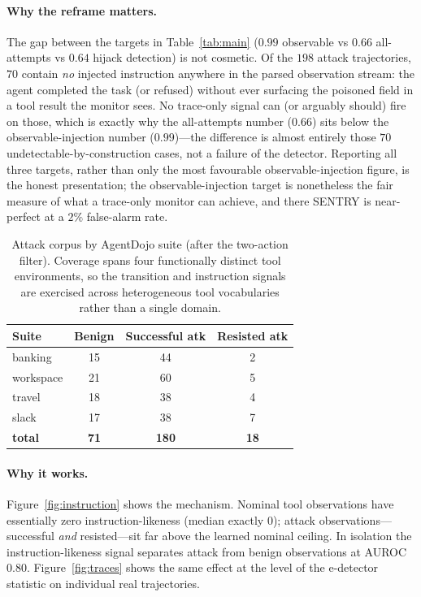 \documentclass[10pt,journal,compsoc]{IEEEtran}
\newcommand{\botrule}{\bottomrule}
\theoremstyle{plain}
\theoremstyle{definition}
\begin{document}
\paragraph{Why the reframe matters.}\label{sec:reframe} The gap between the
targets in Table~\ref{tab:main} (\(0.99\) observable vs \(0.66\) all-attempts
vs \(0.64\) hijack detection) is not cosmetic. Of the \(198\) attack
trajectories, \(70\) contain \emph{no} injected instruction anywhere in the
parsed observation stream: the agent completed the task (or refused) without
ever surfacing the poisoned field in a tool result the monitor sees. No
trace-only signal can (or arguably should) fire on those, which is exactly why
the all-attempts number (\(0.66\)) sits below the observable-injection number
(\(0.99\))---the difference is almost entirely those \(70\)
undetectable-by-construction cases, not a failure of the detector. Reporting
all three targets, rather than only the most favourable observable-injection
figure, is the honest presentation; the observable-injection target is
nonetheless the fair measure of what a trace-only monitor can achieve, and
there SENTRY is near-perfect at a \(2\%\) false-alarm rate.

\begin{table}[!t]
\centering
\caption{Attack corpus by AgentDojo suite (after the two-action filter).
Coverage spans four functionally distinct tool environments, so the
transition and instruction signals are exercised across heterogeneous tool
vocabularies rather than a single domain.}\label{tab:persuite}
\begin{tabular}{@{}lccc@{}}
\toprule
Suite & Benign & Successful atk & Resisted atk \\
\midrule
banking   & 15 & 44 & 2 \\
workspace & 21 & 60 & 5 \\
travel    & 18 & 38 & 4 \\
slack     & 17 & 38 & 7 \\
\midrule
\textbf{total} & \textbf{71} & \textbf{180} & \textbf{18} \\
\botrule
\end{tabular}
\end{table}

\paragraph{Why it works.}
Figure~\ref{fig:instruction} shows the mechanism. Nominal tool observations
have essentially zero instruction-likeness (median exactly \(0\)); attack
observations---successful \emph{and} resisted---sit far above the learned
nominal ceiling. In isolation the instruction-likeness signal separates attack
from benign observations at AUROC \(0.80\). Figure~\ref{fig:traces} shows the
same effect at the level of the e-detector statistic on individual real
trajectories.
\end{document}
